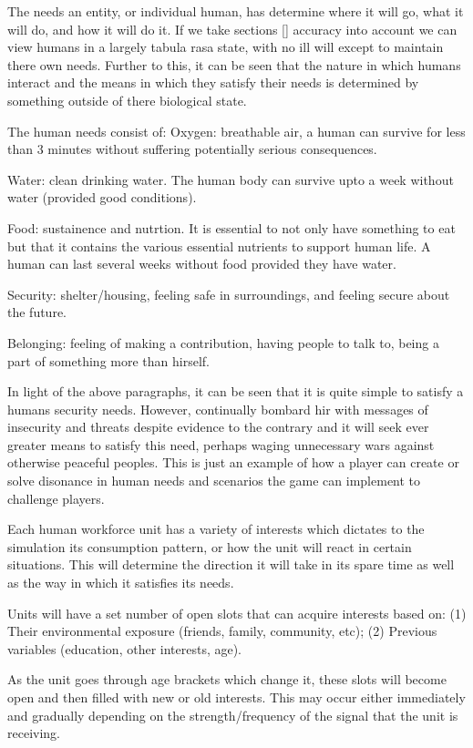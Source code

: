 The needs an entity, or individual human, has determine where it will go, what it will do, and how it will do it. If we take sections [] accuracy into account we can view humans in a largely tabula rasa state, with no ill will except to maintain there own needs. Further to this, it can be seen that the nature in which humans interact and the means in which they satisfy their needs is determined by something outside of there biological state. 

The human needs consist of:
Oxygen: breathable air, a human can survive for less than 3 minutes without suffering potentially serious consequences. 

Water: clean drinking water. The human body can survive upto a week without water (provided good conditions). 

Food: sustainence and nutrtion. It is essential to not only have something to eat but that it contains the various essential nutrients to support human life. A human can last several weeks without food provided they have water.

Security: shelter/housing, feeling safe in surroundings, and feeling secure about the future.

Belonging: feeling of making a contribution, having people to talk to, being a part of something more than hirself.

In light of the above paragraphs, it can be seen that it is quite simple to satisfy a humans security needs. However, continually bombard hir with messages of insecurity and threats despite evidence to the contrary and it will seek ever greater means to satisfy this need, perhaps waging unnecessary wars against otherwise peaceful peoples. This is just an example of how a player can create or solve disonance in human needs and scenarios the game can implement to challenge players.

Each human workforce unit has a variety of interests which dictates to the simulation its consumption pattern, or how the unit will react in certain situations. This will determine the direction it will take in its spare time as well as the way in which it satisfies its needs. 

Units will have a set number of open slots that can acquire interests based on: (1) Their environmental exposure (friends, family, community, etc); (2) Previous variables (education, other interests, age).

As the unit goes through age brackets which change it, these slots will become open and then filled with new or old interests. This may occur either immediately and gradually depending on the strength/frequency of the signal that the unit is receiving. 

